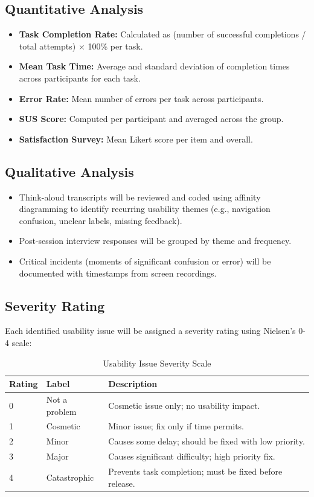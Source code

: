 \documentclass[12pt, titlepage]{article}
\begin{document}
\subsection{Quantitative Analysis}


\begin{itemize}
    \item \textbf{Task Completion Rate:} Calculated as (number of successful completions / total attempts) $\times$ 100\% per task.
    \item \textbf{Mean Task Time:} Average and standard deviation of completion times across participants for each task.
    \item \textbf{Error Rate:} Mean number of errors per task across participants.
    \item \textbf{SUS Score:} Computed per participant and averaged across the group.
    \item \textbf{Satisfaction Survey:} Mean Likert score per item and overall.
\end{itemize}


\subsection{Qualitative Analysis}


\begin{itemize}
    \item Think-aloud transcripts will be reviewed and coded using affinity diagramming to identify recurring usability themes (e.g., navigation confusion, unclear labels, missing feedback).
    \item Post-session interview responses will be grouped by theme and frequency.
    \item Critical incidents (moments of significant confusion or error) will be documented with timestamps from screen recordings.
\end{itemize}


\subsection{Severity Rating}


Each identified usability issue will be assigned a severity rating using Nielsen's 0-4 scale:


\begin{table}[H]
\centering
\caption{Usability Issue Severity Scale}
\begin{tabularx}{\textwidth}{p{1.5cm}p{3cm}X}
\toprule
\textbf{Rating} & \textbf{Label} & \textbf{Description} \\
\midrule
0 & Not a problem & Cosmetic issue only; no usability impact. \\
1 & Cosmetic & Minor issue; fix only if time permits. \\
2 & Minor & Causes some delay; should be fixed with low priority. \\
3 & Major & Causes significant difficulty; high priority fix. \\
4 & Catastrophic & Prevents task completion; must be fixed before release. \\
\bottomrule
\end{tabularx}
\end{table}
\end{document}

